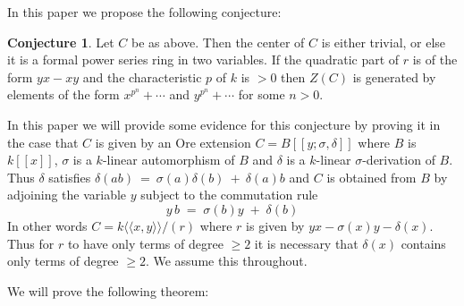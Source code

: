 \documentclass{amsart}
\numberwithin{equation}{section}
\let\blb\mathbb
\def \NN{{\blb N}}
\theoremstyle{definition}
\newtheorem{conjecture}[lemma]{Conjecture}
\theoremstyle{remark}
\begin{document}
In this paper we propose the following conjecture:
\begin{conjecture}
\label{ref-1.1-1}
Let $C$ be as above. Then the  center of $C$ is either trivial,
or else it is a formal power series ring in two variables. If the
quadratic part of $r$ is of the form $yx-xy$   and the
characteristic  $p$ of $k$ is $>0$ then $Z(C)$ is generated by
elements  of the form $x^{p^n}+\cdots$ and $y^{p^n}+\cdots$ for some $n>0$.
\end{conjecture}
\begin{comment}
\begin{conjecture}
    Let $C$ be a non-commutative surface
    \[k\langle \langle x,y \rangle \rangle /(yx\;-\;qxy\;-\;\psi(x,y))\]
    where $q \in k^{*}$ and where the total degree of $\psi(x,y) \mbox{
    is } \geq 3$.
    \\Then $C$ is finite over its center $Z(C)$ and
    $Z(C)\:=\:k[[\alpha,\beta]]$, where $\alpha \: = \: x^{p^{m}}\: 
    +\: \varphi(x)$ and $\beta\:=\:y^{p^{m}}\:+\:\theta(x,y)$, for some $m \in \NN$ 
    and $\varphi(x),\;\theta(x,y)$ have only terms of total degree $>p^{m}$.
\end{conjecture}
\end{comment}
In this paper we will provide some evidence for this conjecture by
proving it  in the case that $C$ is given by an Ore extension
$C=B[[y;\sigma,\delta]]$ where $B$ is $k[[x]]$, $\sigma$ is a
$k$-linear automorphism of $B$ and $\delta$ is a $k$-linear
$\sigma$-derivation of $B$. Thus $\delta$ satisfies
$\delta(ab)\:=\:\sigma(a)\delta(b)\:+\:\delta(a)b$ and $C$ is obtained
from $B$ by adjoining the variable $y$ subject to the commutation rule
\begin{equation} \label{ref-1.1-2}
    y\,b\;=\;\sigma(b)y\;+\;\delta(b)
\end{equation}
In other words $C=k\langle\langle x,y\rangle\rangle/(r)$ where $r$ is given
by $yx-\sigma(x)y-\delta(x)$. Thus for $r$ to have only terms of
degree $\ge 2$ it is necessary that $\delta(x)$ contains only terms
of degree $\ge 2$. We assume this throughout.



We will prove the following theorem:
\end{document}
